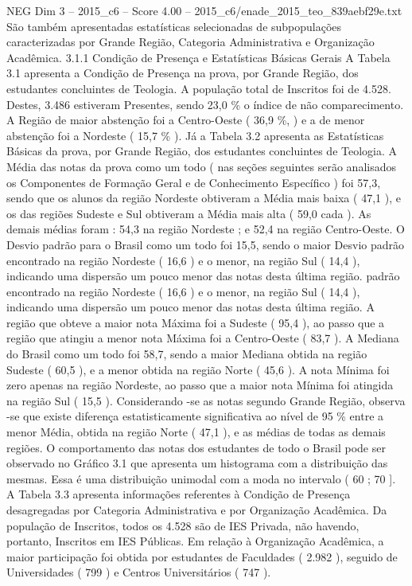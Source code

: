 \begin{textsample}{NEG Dim 3 – 2015\_c6 – Score 4.00 – 2015\_c6/enade\_2015\_teo\_839aebf29e.txt}
São também apresentadas estatísticas selecionadas de subpopulações caracterizadas por Grande Região, Categoria Administrativa e Organização Acadêmica. 3.1.1 Condição de Presença e Estatísticas Básicas Gerais A Tabela 3.1 apresenta a Condição de Presença na prova, por Grande Região, dos estudantes concluintes de Teologia.
A população total de Inscritos foi de 4.528.
Destes, 3.486 estiveram Presentes, sendo 23,0 \% o índice de não comparecimento.
A Região de maior abstenção foi a Centro-Oeste ( 36,9 \%, ) e a de menor abstenção foi a Nordeste ( 15,7 \% ).
Já a Tabela 3.2 apresenta as Estatísticas Básicas da prova, por Grande Região, dos estudantes concluintes de Teologia.
A Média das notas da prova como um todo ( nas seções seguintes serão analisados os Componentes de Formação Geral e de Conhecimento Específico ) foi 57,3, sendo que os alunos da região Nordeste obtiveram a Média mais baixa ( 47,1 ), e os das regiões Sudeste e Sul obtiveram a Média mais alta ( 59,0 cada ).
As demais médias foram : 54,3 na região Nordeste ; e 52,4 na região Centro-Oeste.
O Desvio padrão para o Brasil como um todo foi 15,5, sendo o maior Desvio padrão encontrado na região Nordeste ( 16,6 ) e o menor, na região Sul ( 14,4 ), indicando uma dispersão um pouco menor das notas desta última região. padrão encontrado na região Nordeste ( 16,6 ) e o menor, na região Sul ( 14,4 ), indicando uma dispersão um pouco menor das notas desta última região.
A região que obteve a maior nota Máxima foi a Sudeste ( 95,4 ), ao passo que a região que atingiu a menor nota Máxima foi a Centro-Oeste ( 83,7 ).
A Mediana do Brasil como um todo foi 58,7, sendo a maior Mediana obtida na região Sudeste ( 60,5 ), e a menor obtida na região Norte ( 45,6 ).
A nota Mínima foi zero apenas na região Nordeste, ao passo que a maior nota Mínima foi atingida na região Sul ( 15,5 ).
Considerando -se as notas segundo Grande Região, observa -se que existe diferença estatisticamente significativa ao nível de 95 \% entre a menor Média, obtida na região Norte ( 47,1 ), e as médias de todas as demais regiões.
O comportamento das notas dos estudantes de todo o Brasil pode ser observado no Gráfico 3.1 que apresenta um histograma com a distribuição das mesmas.
Essa é uma distribuição unimodal com a moda no intervalo ( 60 ; 70 ].
A Tabela 3.3 apresenta informações referentes à Condição de Presença desagregadas por Categoria Administrativa e por Organização Acadêmica.
Da população de Inscritos, todos os 4.528 são de IES Privada, não havendo, portanto, Inscritos em IES Públicas.
Em relação à Organização Acadêmica, a maior participação foi obtida por estudantes de Faculdades ( 2.982 ), seguido de Universidades ( 799 ) e Centros Universitários ( 747 ).

\end{textsample}
